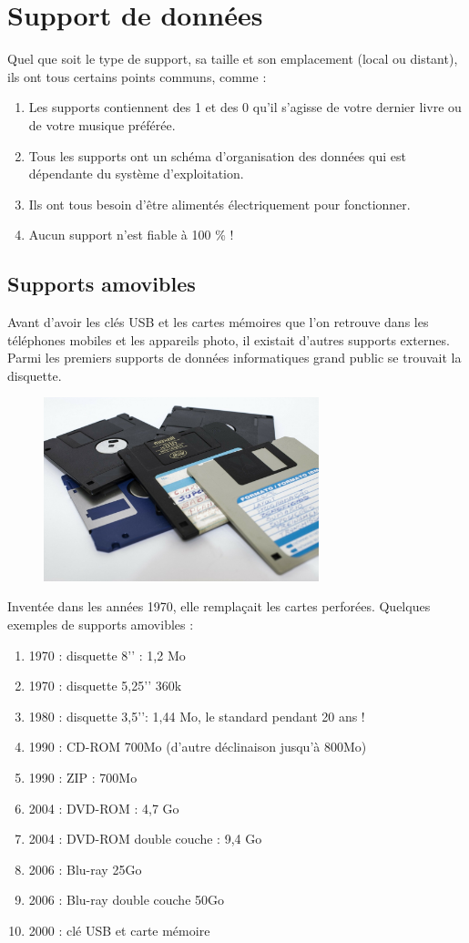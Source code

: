 \documentclass[11pt, a4paper]{book}
\begin{document}
\section{Support de données}

Quel que soit le type de support, sa taille et son emplacement (local ou distant), ils ont tous certains points communs, comme :
\begin{enumerate}
\item Les supports contiennent des 1 et des 0 qu’il s’agisse de votre dernier livre ou de votre musique préférée.
\item Tous les supports ont un schéma d’organisation des données qui est dépendante du système d’exploitation.
\item Ils ont tous besoin d’être alimentés électriquement pour fonctionner.
\item Aucun support n’est fiable à 100 \% !
\end{enumerate}

\subsection{Supports amovibles}
Avant d’avoir les clés USB et les cartes mémoires que l’on retrouve dans les téléphones mobiles et les appareils photo, il existait d’autres supports externes. Parmi les premiers supports de données informatiques grand public se trouvait la disquette.

\begin{figure}[ht!]
\centering
\includegraphics[width=8cm]{images/floppy-disk.jpg}
\end{figure}

Inventée dans les années 1970, elle remplaçait les cartes perforées. Quelques exemples de supports amovibles :
\begin{enumerate}
\item[] 1970 : disquette 8’’ : 1,2 Mo
\item[] 1970 : disquette 5,25’’ 360k
\item[] 1980 : disquette 3,5’’: 1,44 Mo, le standard pendant 20 ans !
\item[] 1990 : CD-ROM 700Mo (d’autre déclinaison jusqu’à 800Mo)
\item[] 1990 : ZIP : 700Mo
\item[] 2004 : DVD-ROM : 4,7 Go
\item[] 2004 : DVD-ROM double couche : 9,4 Go
\item[] 2006 : Blu-ray 25Go
\item[] 2006 : Blu-ray double couche 50Go
\item[] 2000 : clé USB et carte mémoire
\end{enumerate}
\end{document}
